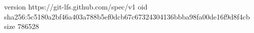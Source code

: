 version https://git-lfs.github.com/spec/v1
oid sha256:5c5180a2bf46a403a788b5ef0dcb67c67324304136bbba98fa00de16f9d8f4cb
size 786528
